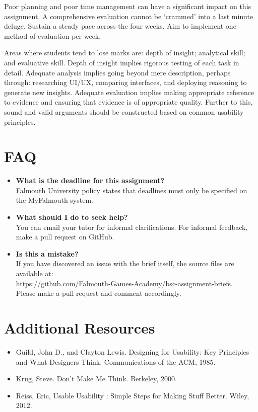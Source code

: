\documentclass{../../fal_assignment}
\begin{document}
Poor planning and poor time management can have a significant impact on this assignment. A comprehensive evaluation cannot be `crammed' into a last minute deluge. Sustain a steady pace across the four weeks. Aim to implement one method of evaluation per week.

Areas where students tend to lose marks are: depth of insight; analytical skill; and evaluative skill. Depth of insight implies rigorous testing of each task in detail. Adequate analysis implies going beyond mere description, perhaps through: researching UI/UX, comparing interfaces, and deploying reasoning to generate new insights. Adequate evaluation implies making appropriate reference to evidence and ensuring that evidence is of appropriate quality. Further to this, sound and valid arguments should be constructed based on common usability principles. 

\section*{FAQ}

\begin{itemize}
	\item 	\textbf{What is the deadline for this assignment?} \\ 
    		Falmouth University policy states that deadlines must only be specified on the MyFalmouth system.
    		
	\item 	\textbf{What should I do to seek help?} \\ 
    		You can email your tutor for informal clarifications. For informal feedback, make a pull request on GitHub. 
    		
    	\item 	\textbf{Is this a mistake?} \\ 	
    		If you have discovered an issue with the brief itself, the source files are available at: \\
    		\url{https://github.com/Falmouth-Games-Academy/bsc-assignment-briefs}.\\
    		 Please make a pull request and comment accordingly.
\end{itemize}

\section*{Additional Resources}
\begin{itemize}
    \item Guild, John D., and Clayton Lewis. Designing for Usability: Key Principles and What Designers Think. Communications of the ACM, 1985.
    \item Krug, Steve. Don't Make Me Think. Berkeley, 2000. 
    \item Reiss, Eric, Usable Usability : Simple Steps for Making Stuff Better. Wiley, 2012.
\end{itemize}
\end{document}
